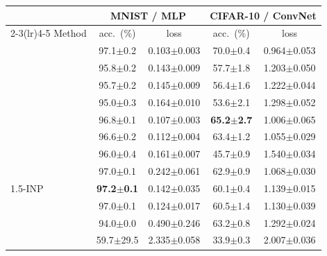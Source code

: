 \begin{tabular}{l cc cc}
\toprule
 & \multicolumn{2}{c}{MNIST / MLP} & \multicolumn{2}{c}{CIFAR-10 / ConvNet} \\
\cmidrule(lr){2-3}\cmidrule(lr){4-5}
Method & acc.\ (\%) & loss & acc.\ (\%) & loss \\
\midrule
\BP{} & 97.1$\pm$0.2 & 0.103$\pm$0.003 & 70.0$\pm$0.4 & 0.964$\pm$0.053 \\
\SPSA{} & 95.8$\pm$0.2 & 0.143$\pm$0.009 & 57.7$\pm$1.8 & 1.203$\pm$0.050 \\
\SPSAb{} & 95.7$\pm$0.2 & 0.145$\pm$0.009 & 56.4$\pm$1.6 & 1.222$\pm$0.044 \\
\RS{} & 95.0$\pm$0.3 & 0.164$\pm$0.010 & 53.6$\pm$2.1 & 1.298$\pm$0.052 \\
\NP{} & 96.8$\pm$0.1 & 0.107$\pm$0.003 & \textbf{65.2$\pm$2.7} & 1.006$\pm$0.065 \\
\ANP{} & 96.6$\pm$0.2 & 0.112$\pm$0.004 & 63.4$\pm$1.2 & 1.055$\pm$0.029 \\
\ANPb{} & 96.0$\pm$0.4 & 0.161$\pm$0.007 & 45.7$\pm$0.9 & 1.540$\pm$0.034 \\
\INP{} & 97.0$\pm$0.1 & 0.242$\pm$0.061 & 62.9$\pm$0.9 & 1.068$\pm$0.030 \\
1.5-INP & \textbf{97.2$\pm$0.1} & 0.142$\pm$0.035 & 60.1$\pm$0.4 & 1.139$\pm$0.015 \\
\DUST{} & 97.0$\pm$0.1 & 0.124$\pm$0.017 & 60.5$\pm$1.4 & 1.130$\pm$0.039 \\
\DANP{} & 94.0$\pm$0.0 & 0.490$\pm$0.246 & 63.2$\pm$0.8 & 1.292$\pm$0.024 \\
\FF{} & 59.7$\pm$29.5 & 2.335$\pm$0.058 & 33.9$\pm$0.3 & 2.007$\pm$0.036 \\
\bottomrule
\end{tabular}
